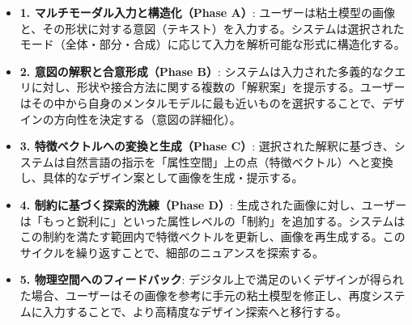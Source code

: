 \documentclass[dvipdfmx]{jlreq}
\begin{document}
\begin{itemize}
  \item \textbf{1. マルチモーダル入力と構造化（Phase A）}:
  ユーザーは粘土模型の画像と、その形状に対する意図（テキスト）を入力する。システムは選択されたモード（全体・部分・合成）に応じて入力を解析可能な形式に構造化する。

  \item \textbf{2. 意図の解釈と合意形成（Phase B）}:
  システムは入力された多義的なクエリに対し、形状や接合方法に関する複数の「解釈案」を提示する。ユーザーはその中から自身のメンタルモデルに最も近いものを選択することで、デザインの方向性を決定する（意図の詳細化）。

  \item \textbf{3. 特徴ベクトルへの変換と生成（Phase C）}:
  選択された解釈に基づき、システムは自然言語の指示を「属性空間」上の点（特徴ベクトル）へと変換し、具体的なデザイン案として画像を生成・提示する。

  \item \textbf{4. 制約に基づく探索的洗練（Phase D）}:
  生成された画像に対し、ユーザーは「もっと鋭利に」といった属性レベルの「制約」を追加する。システムはこの制約を満たす範囲内で特徴ベクトルを更新し、画像を再生成する。このサイクルを繰り返すことで、細部のニュアンスを探索する。

  \item \textbf{5. 物理空間へのフィードバック}:
  デジタル上で満足のいくデザインが得られた場合、ユーザーはその画像を参考に手元の粘土模型を修正し、再度システムに入力することで、より高精度なデザイン探索へと移行する。
\end{itemize}
\end{document}

